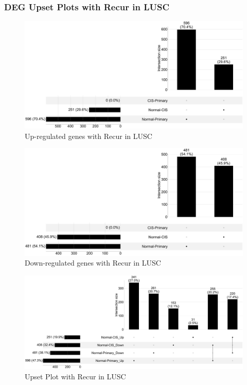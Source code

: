 \documentclass{beamer}
\begin{document}
    \begin{frame}[allowframebreaks]
        \frametitle{DEG Upset Plots with Recur in LUSC}

        \begin{figure}
            \includegraphics[width=0.8 \linewidth]{figures/DEG/Pair-Venn/STAR.FPKM.SQC.Recur.Up.venn.pdf}
            \caption{Up-regulated genes with Recur in LUSC}
        \end{figure}

        \begin{figure}
            \includegraphics[width=0.8 \linewidth]{figures/DEG/Pair-Venn/STAR.FPKM.SQC.Recur.Down.venn.pdf}
            \caption{Down-regulated genes with Recur in LUSC}
        \end{figure}

        \begin{figure}
            \includegraphics[width=0.8 \linewidth]{figures/DEG/Pair-Venn/STAR.FPKM.SQC.Recur.venn.pdf}
            \caption{Upset Plot with Recur in LUSC}
        \end{figure}
    \end{frame}
\end{document}
